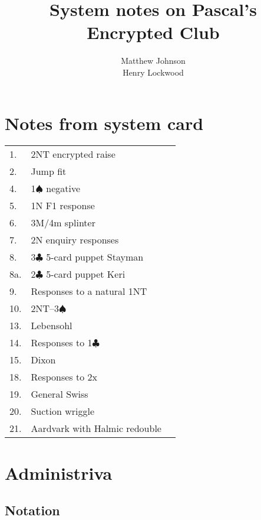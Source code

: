 \documentclass[a4paper,14pt]{extarticle}
\author{Matthew Johnson\\Henry Lockwood}
\title{System notes on Pascal's Encrypted Club}
\begin{document}
\newcommand{\orange}[1]{[OB #1]}
\newcommand{\xref}[1]{[\ref{#1}]}

\maketitle
\tableofcontents

\section*{Notes from system card}
\begin{tabular*}{\textwidth}{ll@{\extracolsep{\fill}}r}
1. & 2NT encrypted raise & \pageref{note:1} \\
2. & Jump fit & \pageref{note:2} \\
4. & 1$\spadesuit$ negative & \pageref{note:4} \\
5. & 1N F1 response & \pageref{note:5} \\
6. & 3M/4m splinter & \pageref{note:6} \\
7. & 2N enquiry responses & \pageref{note:7} \\
8. & 3$\clubsuit$ 5-card puppet Stayman & \pageref{note:8} \\
8a. & 2$\clubsuit$ 5-card puppet Keri & \pageref{note:8a} \\
9. & Responses to a natural 1NT & \pageref{note:9} \\
10. & 2NT--3$\spadesuit$ & \pageref{note:8} \\
13. & Lebensohl & \pageref{note:13} \\
14. & Responses to 1$\clubsuit$ & \pageref{note:14} \\
15. & Dixon & \pageref{note:15} \\
18. & Responses to 2x & \pageref{note:18} \\
19. & General Swiss & \pageref{note:19} \\
20. & Suction wriggle & \pageref{note:20} \\
21. & Aardvark with Halmic redouble & \pageref{note:21} \\
\end{tabular*}

\newpage

\section{Administriva}
\label{sec:admin}

\subsection{Notation}
\label{sec:notation}
\end{document}
